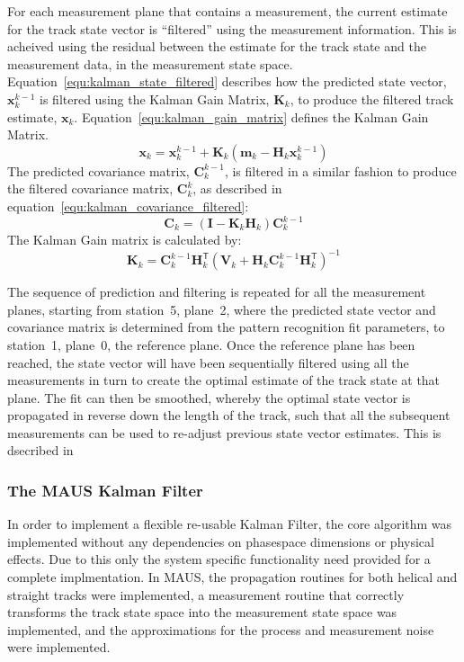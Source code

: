     For each measurement plane that contains a measurement, the current estimate for the track state vector is ``filtered'' using the measurement information. This is acheived using the residual between the estimate for the track state and the measurement data, in the measurement state space. Equation~\ref{equ:kalman_state_filtered} describes how the predicted state vector, $\mathbf{x}_{k}^{k-1}$ is filtered using the Kalman Gain Matrix, $\mathbf{K}_k$, to produce the filtered track estimate, $\mathbf{x}_k$. Equation~\ref{equ:kalman_gain_matrix} defines the Kalman Gain Matrix.
    \begin{equation}
      \mathbf{x}_k = \mathbf{x}_k^{k-1} + \mathbf{K}_k ( \mathbf{m}_k - \mathbf{H}_k \mathbf{x}_k^{k-1} )
      \label{equ:kalman_state_filtered}
    \end{equation}
    The predicted covariance matrix, $\mathbf{C}_k^{k-1}$, is filtered in a similar  fashion to produce the filtered covariance matrix, $\mathbf{C}_k^{k}$, as described in equation~\ref{equ:kalman_covariance_filtered}:
    \begin{equation}
      \mathbf{C}_k = ( \mathbf{I} - \mathbf{K}_k \mathbf{H}_k ) \mathbf{C}_k^{k-1}
      \label{equ:kalman_covariance_filtered}
    \end{equation}
    The Kalman Gain matrix is calculated by:
    \begin{equation}
      \mathbf{K}_k = \mathbf{C}_k^{k-1} \mathbf{H}_k^\mathsf{T} (\mathbf{V}_k + \mathbf{H}_k \mathbf{C}_k^{k-1} \mathbf{H}_k^\mathsf{T})^{-1}
      \label{equ:kalman_gain_matrix}
    \end{equation}

    The sequence of prediction and filtering is repeated for all the measurement planes, starting from station~5, plane~2, where the predicted state vector and covariance matrix is determined from the pattern recognition fit parameters, to station~1, plane~0, the reference plane. Once the reference plane has been reached, the state vector will have been sequentially filtered using all the measurements in turn to create the optimal estimate of the track state at that plane. The fit can then be smoothed, whereby the optimal state vector is propagated in reverse down the length of the track, such that all the subsequent measurements can be used to re-adjust previous state vector estimates. This is dsecribed in~\cite{Fruhwirth}


    \subsubsection{The MAUS Kalman Filter}
    In order to implement a flexible re-usable Kalman Filter, the core algorithm was implemented without any dependencies on phasespace dimensions or physical effects. Due to this only the system specific functionality need provided for a complete implmentation. In MAUS, the propagation routines for both helical and straight tracks were implemented, a measurement routine that correctly transforms the track state space into the measurement state space was implemented, and the approximations for the process and measurement noise were implemented.
    
